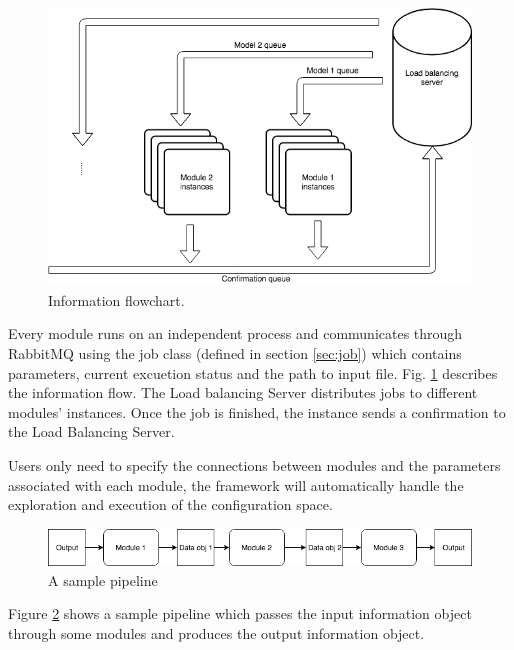 \documentclass{article}
\begin{document}
    \begin{figure}[h]
        \begin{center}
            \includegraphics[width=\textwidth]{fig/information_flow.png}
        \end{center}
        \caption{Information flowchart.}\label{fig:information_flow}
    \end{figure}


    Every module runs on an independent process
    and communicates through RabbitMQ using the job class (defined in section \ref{sec:job}) which contains parameters, current excuetion status and the path to input file.
    Fig. \ref{fig:information_flow} describes the information flow.
    The Load balancing Server distributes jobs to different modules' instances.
    Once the job is finished, the instance sends a confirmation to the Load Balancing Server.


    Users only need to specify the connections between modules and the parameters associated with each module,
    the framework will automatically handle the exploration and execution of the configuration space.

    \begin{figure}[H]
        \begin{center}
            \includegraphics[width=1.2\textwidth]{fig/sample_pipeline.png}
        \end{center}
        \caption{A sample pipeline}\label{fig:sample_pipeline}
    \end{figure}
    Figure \ref{fig:sample_pipeline} shows a sample pipeline which passes the input information object
    through some modules and produces the output information object.
\end{document}
